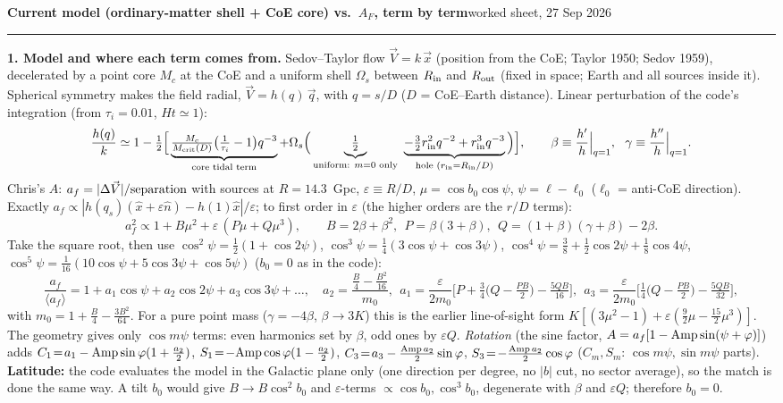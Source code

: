 \documentclass[10pt]{article}
\begin{document}
{\large\bfseries Current model (ordinary-matter shell + CoE core) vs.\ $A_F$, term by term}\hfill{\footnotesize worked sheet, 27 Sep 2026}\\[-2pt]
\rule{\textwidth}{0.4pt}
{\small
\textbf{1. Model and where each term comes from.} Sedov--Taylor flow $\vec V=k\,\vec x$ (position from the CoE; Taylor 1950; Sedov 1959), decelerated by a point core $M_c$ at the CoE and a uniform shell $\Omega_s$ between $R_{\rm in}$ and $R_{\rm out}$ (fixed in space; Earth and all sources inside it). Spherical symmetry makes the field radial, $\vec V=h(q)\,\vec q$, with $q=s/D$ ($D$ = CoE--Earth distance). Linear perturbation of the code's integration (from $\tau_i=0.01$, $H t\simeq1$):
\[
\frac{h(q)}{k}\simeq1-\tfrac12\Big[\underbrace{\tfrac{M_c}{M_{\rm crit}(D)}\big(\tfrac1{\tau_i}-1\big)q^{-3}}_{\text{core tidal term}}+\Omega_s\Big(\underbrace{\tfrac12}_{\text{uniform: }m=0\text{ only}}\ \underbrace{-\tfrac32 r_{\rm in}^2q^{-2}+r_{\rm in}^3q^{-3}}_{\text{hole }(r_{\rm in}=R_{\rm in}/D)}\Big)\Big],\qquad
\beta\equiv\frac{h'}{h}\Big|_{q=1},\ \ \gamma\equiv\frac{h''}{h}\Big|_{q=1}.
\]
Chris's $A$: $a_f=|\Delta\vec V|/{\rm separation}$ with sources at $R=14.3$~Gpc, $\varepsilon\equiv R/D$, $\mu=\cos b_0\cos\psi$, $\psi=\ell-\ell_0$ ($\ell_0$ = anti-CoE direction). Exactly $a_f\propto|h(q_s)(\hat x+\varepsilon\hat n)-h(1)\hat x|/\varepsilon$; to first order in $\varepsilon$ (the higher orders are the $r/D$ terms):
\[
a_f^2\propto1+B\mu^2+\varepsilon\,(P\mu+Q\mu^3),\qquad B=2\beta+\beta^2,\ \ P=\beta(3+\beta),\ \ Q=(1+\beta)(\gamma+\beta)-2\beta .
\]
Take the square root, then use $\cos^2\psi=\tfrac12(1+\cos2\psi)$, $\cos^3\psi=\tfrac14(3\cos\psi+\cos3\psi)$, $\cos^4\psi=\tfrac38+\tfrac12\cos2\psi+\tfrac18\cos4\psi$, $\cos^5\psi=\tfrac1{16}(10\cos\psi+5\cos3\psi+\cos5\psi)$ ($b_0=0$ as in the code):
\[
\frac{a_f}{\langle a_f\rangle}=1+a_1\cos\psi+a_2\cos2\psi+a_3\cos3\psi+\dots,\quad
a_2=\frac{\frac B4-\frac{B^2}{16}}{m_0},\ \
a_1=\frac{\varepsilon}{2m_0}\Big[P+\tfrac34\big(Q-\tfrac{PB}2\big)-\tfrac{5QB}{16}\Big],\ \
a_3=\frac{\varepsilon}{2m_0}\Big[\tfrac14\big(Q-\tfrac{PB}2\big)-\tfrac{5QB}{32}\Big],
\]
with $m_0=1+\frac B4-\frac{3B^2}{64}$. For a pure point mass ($\gamma=-4\beta$, $\beta\to3K$) this is the earlier line-of-sight form $K[(3\mu^2-1)+\varepsilon(\frac92\mu-\frac{15}2\mu^3)]$. The geometry gives only $\cos m\psi$ terms: even harmonics set by $\beta$, odd ones by $\varepsilon Q$. \emph{Rotation} (the sine factor, $A=a_f[1-{\rm Amp}\sin(\psi+\varphi)]$) adds
$C_1\!=\!a_1-{\rm Amp}\sin\varphi(1+\tfrac{a_2}2)$, $S_1\!=\!-{\rm Amp}\cos\varphi(1-\tfrac{a_2}2)$, $C_3\!=\!a_3-\tfrac{{\rm Amp}\,a_2}2\sin\varphi$, $S_3\!=\!-\tfrac{{\rm Amp}\,a_2}2\cos\varphi$ ($C_m,S_m$: $\cos m\psi,\sin m\psi$ parts).
\textbf{Latitude:} the code evaluates the model in the Galactic plane only (one direction per degree, no $|b|$ cut, no sector average), so the match is done the same way. A tilt $b_0$ would give $B\to B\cos^2b_0$ and $\varepsilon$-terms $\propto\cos b_0,\cos^3b_0$, degenerate with $\beta$ and $\varepsilon Q$; therefore $b_0=0$.


}
\end{document}
